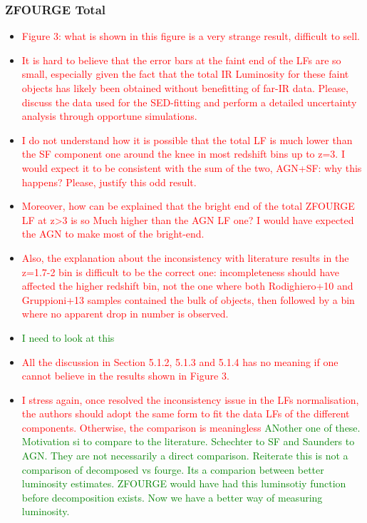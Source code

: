 \subsubsection{ZFOURGE Total}
\begin{itemize}
    \item \textcolor{red}{Figure 3: what is shown in this figure is a very strange result, difficult to sell. }
    
    \item \textcolor{red}{It is hard to believe that the error bars at the faint end of the LFs are so small, especially given the fact that the total IR Luminosity for these faint objects has likely been obtained without benefitting of far-IR data. Please, discuss the data used for the SED-fitting and perform a detailed uncertainty analysis through opportune simulations.}
    
    \item \textcolor{red}{I do not understand how it is possible that the total LF is much lower than the SF component one around the knee in most redshift bins up to z=3. I would expect it to be consistent with the sum of the two, AGN+SF: why this happens? Please, justify this odd result.}
    
    \item \textcolor{red}{Moreover, how can be explained that the bright end of the total ZFOURGE LF at z>3 is so Much higher than the AGN LF one? I would have expected the AGN to make most of the bright-end.}
    
    \item \textcolor{red}{Also, the explanation about the inconsistency with literature results in the z=1.7-2 bin is difficult to be the correct one: incompleteness should have affected the higher redshift bin, not the one where both Rodighiero+10 and Gruppioni+13 samples contained the bulk of objects, then followed by a bin where no apparent drop in number is observed.}
    \item \textcolor{Green}{I need to look at this}
    
    \item \textcolor{red}{All the discussion in Section 5.1.2, 5.1.3 and 5.1.4 has no meaning if one cannot believe in the results shown in Figure 3.}
    
    \item \textcolor{red}{I stress again, once resolved the inconsistency issue in the LFs normalisation, the authors should adopt the same form to fit the data LFs of the different components. Otherwise, the comparison is meaningless}
    \textcolor{Green}{ANother one of these. Motivation si to compare to the literature. Schechter to SF and Saunders to AGN. They are not necessarily a direct comparison. Reiterate this is not a comparison of decomposed vs fourge. Its a comparion between better luminosity estimates. ZFOURGE would have had this luminsotiy function before decomposition exists. Now we have a better way of measuring luminosity.}
\end{itemize}

